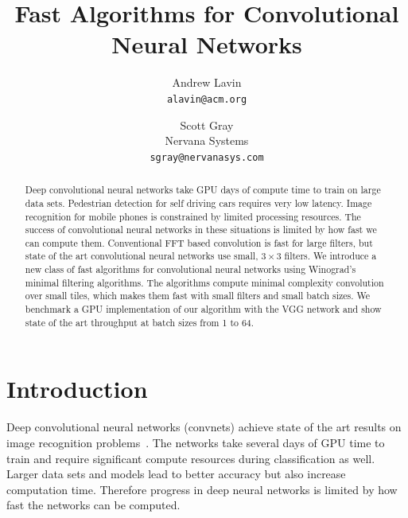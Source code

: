\documentclass[10pt,twocolumn,letterpaper]{article}
\begin{document}
\title{Fast Algorithms for Convolutional Neural Networks}

\author{Andrew Lavin\\
{\tt\small alavin@acm.org}
\and
Scott Gray\\
Nervana Systems\\
{\tt\small sgray@nervanasys.com}
}

\maketitle

\begin{abstract}
Deep convolutional neural networks take GPU days of compute time to train on large data sets. Pedestrian detection  for self driving cars requires very low latency. Image recognition for mobile phones is constrained by limited processing resources. The success of convolutional neural networks in these situations is limited by how fast we can compute them. Conventional FFT based convolution is fast for large filters, but state of the art convolutional neural networks use small, $3 \times 3$ filters. We introduce a new class of fast algorithms for convolutional neural networks using Winograd's minimal filtering algorithms. The algorithms compute minimal complexity convolution over  small tiles, which makes them fast with small filters and small batch sizes. We benchmark a GPU implementation of our algorithm with the VGG network and show state of the art throughput at batch sizes from 1 to 64. 
\end{abstract}

\section{Introduction}

Deep convolutional neural networks (convnets) achieve state of the art results on image recognition problems~\cite{simonyan2014very}\cite{ioffe2015batch}. The networks take several days of GPU time to train and require significant compute resources during classification as well. Larger data sets and models lead to better accuracy but also increase computation time. Therefore progress in deep neural networks is limited by how fast the networks can be computed.
\end{document}
